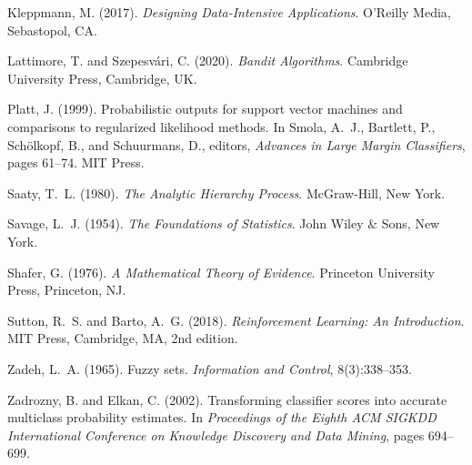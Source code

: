 \documentclass[12pt,a4paper]{article}
\begin{document}
\begin{thebibliography}{99}
Kleppmann, M. (2017).
\newblock \emph{Designing Data-Intensive Applications}.
\newblock O'Reilly Media, Sebastopol, CA.

Lattimore, T. and Szepesvári, C. (2020).
\newblock \emph{Bandit Algorithms}.
\newblock Cambridge University Press, Cambridge, UK.

Platt, J. (1999).
\newblock Probabilistic outputs for support vector machines and comparisons to regularized likelihood methods.
\newblock In Smola, A.~J., Bartlett, P., Schölkopf, B., and Schuurmans, D., editors, \emph{Advances in Large Margin Classifiers}, pages 61--74. MIT Press.

Saaty, T.~L. (1980).
\newblock \emph{The Analytic Hierarchy Process}.
\newblock McGraw-Hill, New York.

Savage, L.~J. (1954).
\newblock \emph{The Foundations of Statistics}.
\newblock John Wiley \& Sons, New York.

Shafer, G. (1976).
\newblock \emph{A Mathematical Theory of Evidence}.
\newblock Princeton University Press, Princeton, NJ.

Sutton, R.~S. and Barto, A.~G. (2018).
\newblock \emph{Reinforcement Learning: An Introduction}.
\newblock MIT Press, Cambridge, MA, 2nd edition.

Zadeh, L.~A. (1965).
\newblock Fuzzy sets.
\newblock \emph{Information and Control}, 8(3):338--353.

Zadrozny, B. and Elkan, C. (2002).
\newblock Transforming classifier scores into accurate multiclass probability estimates.
\newblock In \emph{Proceedings of the Eighth ACM SIGKDD International Conference on Knowledge Discovery and Data Mining}, pages 694--699.

\end{thebibliography}
\end{document}
